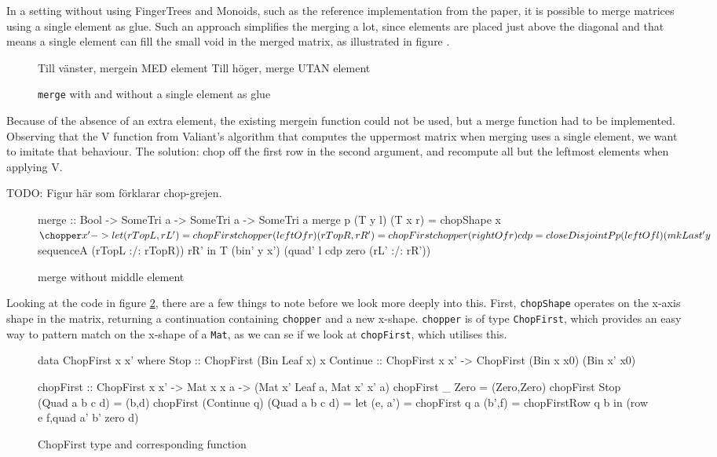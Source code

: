 \documentclass[a4paper,12pt,twosided]{report}
\begin{document}
In a setting without using FingerTrees and Monoids, such as the reference
implementation from the paper, it is possible to merge matrices using a single
element as glue. Such an approach simplifies the merging a lot, since elements
are placed just above the diagonal and that means a single element can fill the
small void in the merged matrix, as illustrated in figure \label{mergein}.

\begin{figure}[H]
Till vänster, mergein MED element
Till höger, merge UTAN element
\caption{\label{mergein}\texttt{merge} with and without a single element as glue}
\end{figure}

Because of the absence of an extra element, the existing mergein function could
not be used, but a merge function had to be implemented. Observing that the V
function from Valiant's algorithm that computes the uppermost matrix when
merging uses a single element, we want to imitate that behaviour. The solution:
chop off the first row in the second argument, and recompute all but the
leftmost elements when applying V. 

TODO: Figur här som förklarar chop-grejen.

\begin{figure}[H]
\begin{code}
merge :: Bool -> SomeTri a -> SomeTri a -> SomeTri a
merge p (T y l) (T x r) = chopShape x $ \chopper x' ->
    let (rTopL, rL') = chopFirst chopper (leftOf r)
        (rTopR, rR') = chopFirst chopper (rightOf r)
        cdp = closeDisjointP p (leftOf l) 
                (mkLast' y $ sequenceA (rTopL :/: rTopR)) rR'
    in T (bin' y x') (quad' l cdp zero (rL' :/: rR'))
\end{code}
\caption{merge without middle element}
\label{merge}
\end{figure}

Looking at the code in figure \ref{merge}, there are a few things to note before
we look more deeply into this. First, \texttt{chopShape} operates on the x-axis
shape in the matrix, returning a continuation containing \texttt{chopper} and a
new x-shape. \texttt{chopper} is of type \texttt{ChopFirst}, which provides an
easy way to pattern match on the x-shape of a \texttt{Mat}, as we can se if we
look at \texttt{chopFirst}, which utilises this.

\begin{figure}[H]
\begin{code}
data ChopFirst x x' where
  Stop :: ChopFirst (Bin Leaf x) x
  Continue :: ChopFirst x x' -> ChopFirst (Bin x x0) (Bin x' x0)

chopFirst :: ChopFirst x x' -> Mat x x a  
                            -> (Mat x' Leaf a, Mat x' x' a)
chopFirst _ Zero = (Zero,Zero)
chopFirst Stop (Quad a b c d) = (b,d)
chopFirst (Continue q) (Quad a b c d) =
  let  (e, a') = chopFirst q a
       (b',f)  = chopFirstRow q b
  in (row e f,quad a' b' zero d)
\end{code}
\caption{\label{chopfirst} ChopFirst type and corresponding function}
\end{figure}
\end{document}

